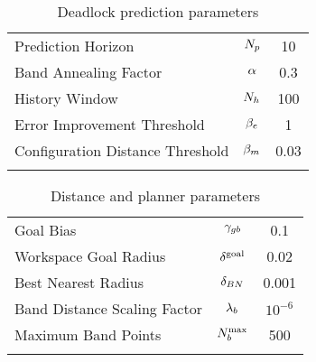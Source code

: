 \begin{table}[ht]
\centering
\caption{Deadlock prediction parameters}
\label{tab:deadlock_param_table}
\begin{tabular}{lcc}
\noalign{\smallskip}\hline\noalign{\smallskip}
Prediction Horizon                  & $N_p$          &    10 \\
Band Annealing Factor               & $\alpha$        &   0.3 \\
History Window                      & $N_h$              &   100 \\
Error Improvement Threshold         & $\beta_e$     &     1 \\
Configuration Distance Threshold    & $\beta_m$    &  0.03 \\
\noalign{\smallskip}\hline
\end{tabular}
\end{table}


\begin{table}[ht]
\centering
\caption{Distance and planner parameters}
\label{tab:rrt_param_table}
\begin{tabular}{lcc}
\noalign{\smallskip}\hline\noalign{\smallskip}
Goal Bias                           & $\gamma_{gb}$                   &     0.1 \\
Workspace Goal Radius               & $\delta^\textrm{goal}$               &     0.02 \\
Best Nearest Radius                 & $\delta_{BN}$               &     0.001 \\
Band Distance Scaling Factor        & $\lambda_b$              & $10^{-6}$ \\
Maximum Band Points                 & $N_b^\textrm{max}$             & 500 \\
\noalign{\smallskip}\hline
\end{tabular}
\end{table}




